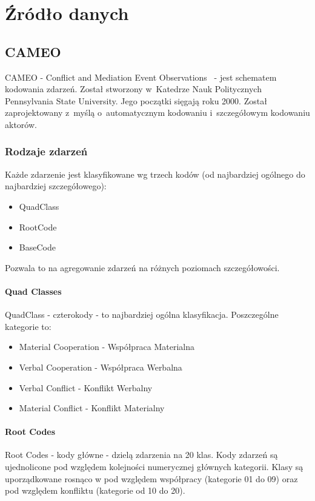 \documentclass[11pt]{report}
\begin{document}
    \chapter{Źródło danych}\label{ch:źródło}


    \section{CAMEO}\label{sec:cameo}
    CAMEO - Conflict and Mediation Event Observations~\cite{GDELTDocumentation} - jest schematem kodowania zdarzeń.
    Został stworzony w~Katedrze Nauk Politycznych Pennsylvania State University.
    Jego początki sięgają roku 2000.
    Został zaprojektowany z~myślą o~automatycznym kodowaniu i~szczegółowym kodowaniu aktorów.

    \subsection{Rodzaje zdarzeń}
    Każde zdarzenie jest klasyfikowane wg trzech kodów (od najbardziej ogólnego do najbardziej szczegółowego):
    \begin{itemize}
        \item QuadClass
        \item RootCode
        \item BaseCode
    \end{itemize}
    Pozwala to na agregowanie zdarzeń na różnych poziomach szczegółowości.

    \subsubsection{Quad Classes}
    QuadClass - czterokody - to najbardziej ogólna klasyfikacja.
    Poszczególne kategorie to:
    \begin{itemize}
        \item Material Cooperation - Współpraca Materialna
        \item Verbal Cooperation - Współpraca Werbalna
        \item Verbal Conflict - Konflikt Werbalny
        \item Material Conflict - Konflikt Materialny
    \end{itemize}

    \subsubsection{Root Codes}
    Root Codes - kody główne - dzielą zdarzenia na 20 klas.
    Kody zdarzeń są ujednolicone pod względem kolejności numerycznej głównych kategorii.
    Klasy są uporządkowane rosnąco w pod względem współpracy (kategorie 01 do 09) oraz pod względem konfliktu
    (kategorie od 10 do 20).
\end{document}

